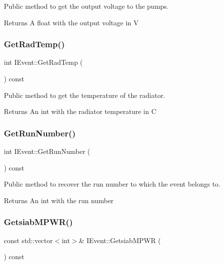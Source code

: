Public method to get the output voltage to the pumps. 

\begin{DoxyReturn}{Returns}
A float with the output voltage in V 
\end{DoxyReturn}
\mbox{\label{classIEvent_a81f3a4f65606318ac4d5d99ee9e04fbd}} 
\subsubsection{\texorpdfstring{Get\+Rad\+Temp()}{GetRadTemp()}}
{\footnotesize\ttfamily int I\+Event\+::\+Get\+Rad\+Temp (\begin{DoxyParamCaption}{ }\end{DoxyParamCaption}) const}



Public method to get the temperature of the radiator. 

\begin{DoxyReturn}{Returns}
An int with the radiator temperature in C 
\end{DoxyReturn}
\mbox{\label{classIEvent_a2828467dd503a15bdfb83b4ce8452aa6}} 
\subsubsection{\texorpdfstring{Get\+Run\+Number()}{GetRunNumber()}}
{\footnotesize\ttfamily int I\+Event\+::\+Get\+Run\+Number (\begin{DoxyParamCaption}{ }\end{DoxyParamCaption}) const}



Public method to recover the run number to which the event belongs to. 

\begin{DoxyReturn}{Returns}
An int with the run number 
\end{DoxyReturn}
\mbox{\label{classIEvent_a3fa8602e84ca81932f2a21a9b5943b1c}} 
\subsubsection{\texorpdfstring{Getsiab\+M\+P\+W\+R()}{GetsiabMPWR()}}
{\footnotesize\ttfamily const std\+::vector$<$int$>$\& I\+Event\+::\+Getsiab\+M\+P\+WR (\begin{DoxyParamCaption}{ }\end{DoxyParamCaption}) const}



